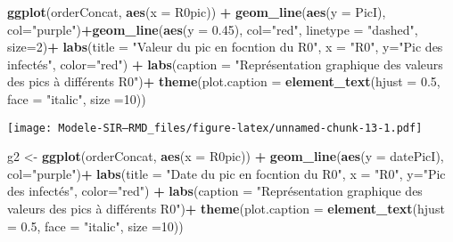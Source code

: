 \documentclass[
]{article}
\newenvironment{Shaded}{\begin{snugshade}}{\end{snugshade}}
\newcommand{\DataTypeTok}[1]{\textcolor[rgb]{0.13,0.29,0.53}{#1}}
\newcommand{\DecValTok}[1]{\textcolor[rgb]{0.00,0.00,0.81}{#1}}
\newcommand{\FloatTok}[1]{\textcolor[rgb]{0.00,0.00,0.81}{#1}}
\newcommand{\KeywordTok}[1]{\textcolor[rgb]{0.13,0.29,0.53}{\textbf{#1}}}
\newcommand{\NormalTok}[1]{#1}
\newcommand{\OperatorTok}[1]{\textcolor[rgb]{0.81,0.36,0.00}{\textbf{#1}}}
\newcommand{\StringTok}[1]{\textcolor[rgb]{0.31,0.60,0.02}{#1}}
\begin{document}
\begin{Shaded}
\begin{Highlighting}[]
\KeywordTok{ggplot}\NormalTok{(orderConcat, }\KeywordTok{aes}\NormalTok{(}\DataTypeTok{x =}\NormalTok{ R0pic)) }\OperatorTok{+}\StringTok{ }\KeywordTok{geom_line}\NormalTok{(}\KeywordTok{aes}\NormalTok{(}\DataTypeTok{y =}\NormalTok{ PicI), }\DataTypeTok{col=}\StringTok{"purple"}\NormalTok{)}\OperatorTok{+}\KeywordTok{geom_line}\NormalTok{(}\KeywordTok{aes}\NormalTok{(}\DataTypeTok{y =} \FloatTok{0.45}\NormalTok{), }\DataTypeTok{col=}\StringTok{"red"}\NormalTok{, }\DataTypeTok{linetype =} \StringTok{"dashed"}\NormalTok{, }\DataTypeTok{size=}\DecValTok{2}\NormalTok{)}\OperatorTok{+}\StringTok{ }\KeywordTok{labs}\NormalTok{(}\DataTypeTok{title =} \StringTok{"Valeur du pic en focntion du R0"}\NormalTok{, }\DataTypeTok{x =} \StringTok{"R0"}\NormalTok{, }\DataTypeTok{y=}\StringTok{"Pic des infectés"}\NormalTok{, }\DataTypeTok{color=}\StringTok{"red"}\NormalTok{) }\OperatorTok{+}\StringTok{ }\KeywordTok{labs}\NormalTok{(}\DataTypeTok{caption =} \StringTok{"Représentation graphique des valeurs des pics à différents R0"}\NormalTok{)}\OperatorTok{+}\StringTok{ }\KeywordTok{theme}\NormalTok{(}\DataTypeTok{plot.caption =} \KeywordTok{element_text}\NormalTok{(}\DataTypeTok{hjust =} \FloatTok{0.5}\NormalTok{, }\DataTypeTok{face =} \StringTok{"italic"}\NormalTok{, }\DataTypeTok{size =}\DecValTok{10}\NormalTok{))}
\end{Highlighting}
\end{Shaded}

\texttt{[image: Modele-SIR---RMD\_files/figure-latex/unnamed-chunk-13-1.pdf]}

\begin{Shaded}
\begin{Highlighting}[]
\NormalTok{g2 <-}\StringTok{ }\KeywordTok{ggplot}\NormalTok{(orderConcat, }\KeywordTok{aes}\NormalTok{(}\DataTypeTok{x =}\NormalTok{ R0pic)) }\OperatorTok{+}\StringTok{ }\KeywordTok{geom_line}\NormalTok{(}\KeywordTok{aes}\NormalTok{(}\DataTypeTok{y =}\NormalTok{ datePicI), }\DataTypeTok{col=}\StringTok{"purple"}\NormalTok{)}\OperatorTok{+}\StringTok{ }\KeywordTok{labs}\NormalTok{(}\DataTypeTok{title =} \StringTok{"Date du pic en focntion du R0"}\NormalTok{, }\DataTypeTok{x =} \StringTok{"R0"}\NormalTok{, }\DataTypeTok{y=}\StringTok{"Pic des infectés"}\NormalTok{, }\DataTypeTok{color=}\StringTok{"red"}\NormalTok{) }\OperatorTok{+}\StringTok{ }\KeywordTok{labs}\NormalTok{(}\DataTypeTok{caption =} \StringTok{"Représentation graphique des valeurs des pics à différents R0"}\NormalTok{)}\OperatorTok{+}\StringTok{ }\KeywordTok{theme}\NormalTok{(}\DataTypeTok{plot.caption =} \KeywordTok{element_text}\NormalTok{(}\DataTypeTok{hjust =} \FloatTok{0.5}\NormalTok{, }\DataTypeTok{face =} \StringTok{"italic"}\NormalTok{, }\DataTypeTok{size =}\DecValTok{10}\NormalTok{))}
\end{Highlighting}
\end{Shaded}
\end{document}
